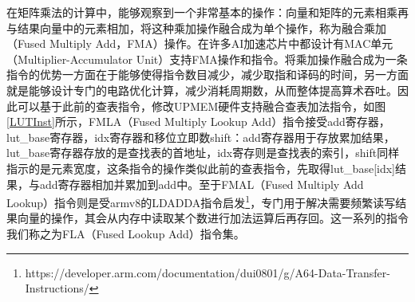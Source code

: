 在矩阵乘法的计算中，能够观察到一个非常基本的操作：向量和矩阵的元素相乘再与结果向量中的元素相加，将这种乘加操作融合成为单个操作，称为融合乘加（Fused Multiply Add，FMA）操作。在许多AI加速芯片中都设计有MAC单元（Multiplier-Accumulator Unit）支持FMA操作和指令。将乘加操作融合成为一条指令的优势一方面在于能够使得指令数目减少，减少取指和译码的时间，另一方面就是能够设计专门的电路优化计算，减少消耗周期数，从而整体提高算术吞吐。因此可以基于此前的查表指令，修改UPMEM硬件支持融合查表加法指令，如图\ref{LUTInst}所示，FMLA（Fused Multiply Lookup Add）指令接受add寄存器，lut\_base寄存器，idx寄存器和移位立即数shift：add寄存器用于存放累加结果，lut\_base寄存器存放的是查找表的首地址，idx寄存则是查找表的索引，shift同样指示的是元素宽度，这条指令的操作类似此前的查表指令，先取得lut\_base[idx]结果，与add寄存器相加并累加到add中。至于FMAL（Fused Multiply Add Lookup）指令则是受armv8的LDADDA指令启发\footnote{https://developer.arm.com/documentation/dui0801/g/A64-Data-Transfer-Instructions/}，专门用于解决需要频繁读写结果向量的操作，其会从内存中读取某个数进行加法运算后再存回。这一系列的指令我们称之为FLA（Fused Lookup Add）指令集。

